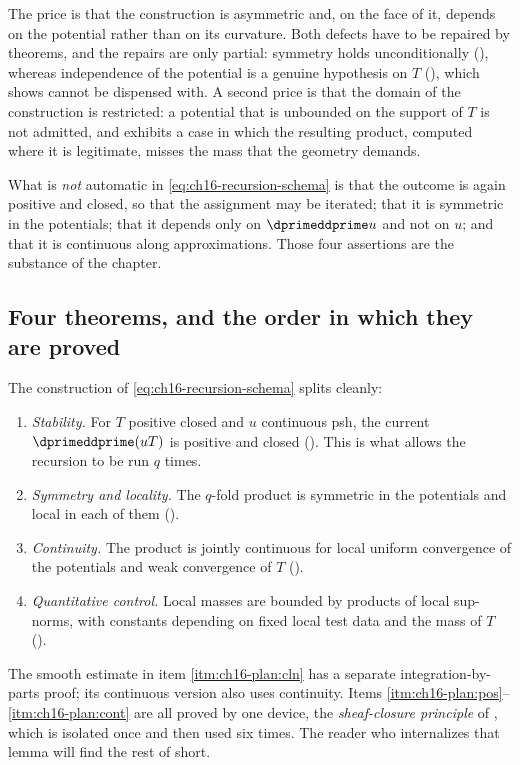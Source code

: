 The price is that the construction is asymmetric and, on the face of it,
depends on the potential rather than on its curvature.  Both defects have to
be repaired by theorems, and the repairs are only partial: symmetry holds
unconditionally (), whereas independence of
the potential is a genuine hypothesis on $T$ (),
which  shows cannot be dispensed with.  A second
price is that the domain of the construction is restricted: a potential that
is unbounded on the support of $T$ is not admitted, and
 exhibits a case in which the resulting product,
computed where it is legitimate, misses the mass that the geometry demands.

What is \emph{not} automatic in \eqref{eq:ch16-recursion-schema} is that the
outcome is again positive and closed, so that the assignment may be
iterated; that it is symmetric in the potentials; that it depends only on
$\dprimeddprime u$ and not on $u$; and that it is continuous along
approximations.  Those four assertions are the substance of the chapter.

\subsection{Four theorems, and the order in which they are proved}
\label{sec:ch16-four-theorems}

The construction of \eqref{eq:ch16-recursion-schema} splits cleanly:
\begin{enumerate}
\item\label{itm:ch16-plan:pos}
 \emph{Stability.}  For $T$ positive closed and $u$ continuous psh, the
 current $\dprimeddprime(uT)$ is positive and closed
 ().  This is what allows the recursion to be run
 $q$ times.
\item\label{itm:ch16-plan:sym}
 \emph{Symmetry and locality.}  The $q$-fold product is symmetric in the
 potentials and local in each of them
 ().
\item\label{itm:ch16-plan:cont}
 \emph{Continuity.}  The product is jointly continuous for local uniform
 convergence of the potentials and weak convergence of $T$
 ().
\item\label{itm:ch16-plan:cln}
 \emph{Quantitative control.}  Local masses are bounded by products of
 local sup-norms, with constants depending on fixed local test data
 and the mass of $T$
 ().
\end{enumerate}
The smooth estimate in item \cref{itm:ch16-plan:cln} has a separate
integration-by-parts proof; its continuous version also uses continuity.
Items
\cref{itm:ch16-plan:pos}--\cref{itm:ch16-plan:cont} are all proved by one
device, the \emph{sheaf-closure principle} of
, which is isolated once and then used six
times.  The reader who internalizes that lemma will find the rest of
 short.

